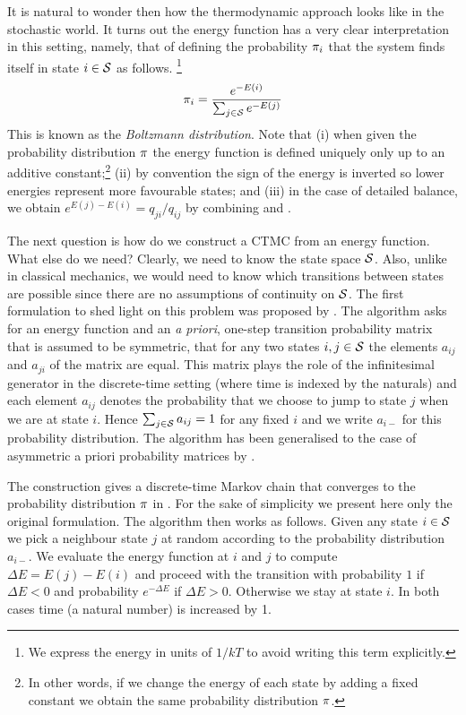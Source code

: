 It is natural to wonder then how the thermodynamic approach
looks like in the stochastic world.
It turns out the energy function has a very clear interpretation
in this setting, namely, that of defining the probability $\pi_i$
that the system finds itself in state $i \in \mathcal{S}$ as follows.%
\footnote{
  We express the energy in units of $1/kT$ to avoid
  writing this term explicitly.}
\begin{equation}
  \label{eq:energy}
  \pi_i = \frac{e^{-E(i)}}{\sum_{j \in \mathcal{S}} e^{-E(j)}}
\end{equation}
This is known as the \emph{Boltzmann distribution}.
Note that
(i) when given the probability distribution $\pi$
the energy function is defined uniquely
only up to an additive constant;\footnote{
  In other words, if we change the energy of each state by adding
  a fixed constant we obtain the same probability distribution $\pi$.}
(ii) by convention the sign of the energy is inverted
so lower energies represent more favourable states; and
(iii) in the case of detailed balance,
we obtain $e^{E(j)-E(i)} = q_{ji}/q_{ij}$
by combining  and .

The next question is how do we construct a CTMC
from an energy function.
What else do we need?
Clearly, we need to know the state space $\mathcal{S}$.
Also, unlike in classical mechanics,
we would need to know which transitions between states are possible
since there are no assumptions of continuity on $\mathcal{S}$.
The first formulation to shed light on this problem
was proposed by \citet{metropolis}.
The algorithm asks for an energy function and an \emph{a priori},
one-step transition probability matrix
that is assumed to be symmetric,
\ie that for any two states $i,j \in \mathcal{S}$
the elements $a_{ij}$ and $a_{ji}$ of the matrix are equal.
This matrix plays the role of the infinitesimal generator in the
discrete-time setting (\ie where time is indexed by the naturals)
and each element $a_{ij}$ denotes the probability that
we choose to jump to state $j$ when we are at state $i$.
Hence $\sum_{j \in \mathcal{S}} a_{ij} = 1$ for any fixed $i$
and we write $a_{i-}$ for this probability distribution.
The algorithm has been generalised to the case of asymmetric
a priori probability matrices by \citet{hastings}.

The construction gives a discrete-time Markov chain that
converges to the probability distribution $\pi$ in .
For the sake of simplicity we present here
only the original formulation.
The algorithm then works as follows.
Given any state $i \in \mathcal{S}$ we pick a neighbour state $j$
at random according to the probability distribution $a_{i-}$.
We evaluate the energy function at $i$ and $j$
to compute $\Delta E = E(j)-E(i)$ and proceed with the transition
with probability $1$ if $\Delta E < 0$ and
probability $e^{-\Delta E}$ if $\Delta E > 0$.
Otherwise we stay at state $i$.
In both cases time (a natural number) is increased by 1.


